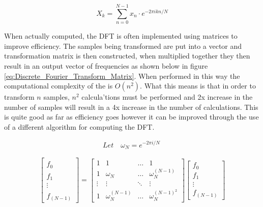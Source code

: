 \documentclass[12pt]{report}
\begin{document}
\begin{equation}
    X_k = \sum_{n=0}^{N-1} x_n \cdot e^{-2 \pi i k n / N}
    \label{eq:Discrete_Fourier_Transform}
\end{equation}


When actually computed, the DFT is often implemented using matrices to improve efficiency. The samples being transformed are put into a vector and transformation matrix is then constructed, when multiplied together they then result in an output vector of frequencies as shown below in figure \ref{eq:Discrete_Fourier_Transform_Matrix}. When performed in this way the computational complexity of the is $O (n^2)$. What this means is that in order to transform $n$ samples, $n^2$ calcula'tions must be performed and 2x increase in the number of samples will result in a 4x increase in the number of calculations. This is quite good as far as efficiency goes however it can be improved through the use of a different algorithm for computing the DFT.

\begin{align*}
    Let \quad \omega_{N} = e^{-2 \pi i / N} \
\end{align*}

\begin{equation}
    \begin{bmatrix} 
        \hat{f}_{0} \\
        \hat{f}_{1} \\
        \vdots  \\
        \hat{f}_{(N-1)}
    \end{bmatrix}
    =
    \begin{bmatrix} 
    1 & 1 & \dots  & 1\\
    1 & \omega_N  & \dots & \omega_N^{(N-1)}\\
    \vdots & \vdots & \ddots & \vdots\\
    1 & \omega_N^{(N-1)} & \dots &  \omega_N^{(N-1)^2}
    \end{bmatrix}
    \begin{bmatrix} 
        f_{0} \\
        f_{1} \\
        \vdots  \\
        f_{(N-1)}
    \end{bmatrix}
    \label{eq:Discrete_Fourier_Transform_Matrix}
\end{equation}
\end{document}
